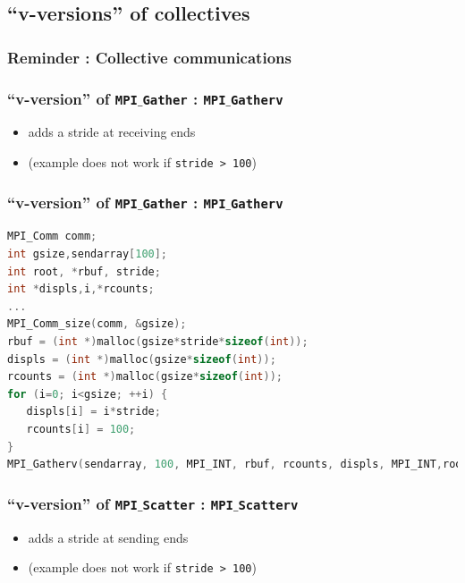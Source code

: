 \subsection{``v-versions'' of collectives}


\begin{frame}[containsverbatim]
\frametitle{Reminder : Collective communications}

\begin{center}

\end{center}

\end{frame}


\begin{frame}[containsverbatim]
\frametitle{``v-version'' of \texttt{MPI$\_$Gather} : \texttt{MPI$\_$Gatherv}}
\begin{itemize}
	\item {adds a stride at receiving ends}
	\item {(example does not work if \texttt{stride > 100})}
\end{itemize}

\begin{center}

\end{center}

\end{frame}


\begin{frame}[containsverbatim]
\frametitle{``v-version'' of \texttt{MPI$\_$Gather} : \texttt{MPI$\_$Gatherv}}
\begin{lstlisting}[language=C,frame=lines]
MPI_Comm comm;
int gsize,sendarray[100];
int root, *rbuf, stride;
int *displs,i,*rcounts;
...
MPI_Comm_size(comm, &gsize);
rbuf = (int *)malloc(gsize*stride*sizeof(int));
displs = (int *)malloc(gsize*sizeof(int));
rcounts = (int *)malloc(gsize*sizeof(int));
for (i=0; i<gsize; ++i) {
   displs[i] = i*stride;
   rcounts[i] = 100;
}
MPI_Gatherv(sendarray, 100, MPI_INT, rbuf, rcounts, displs, MPI_INT,root, comm);
\end{lstlisting}
\end{frame}


\begin{frame}[containsverbatim]
\frametitle{``v-version'' of \texttt{MPI$\_$Scatter} : \texttt{MPI$\_$Scatterv}}
\begin{itemize}
	\item {adds a stride at sending ends}
	\item {(example does not work if \texttt{stride > 100})}
\end{itemize}

\begin{center}

\end{center}

\end{frame}


